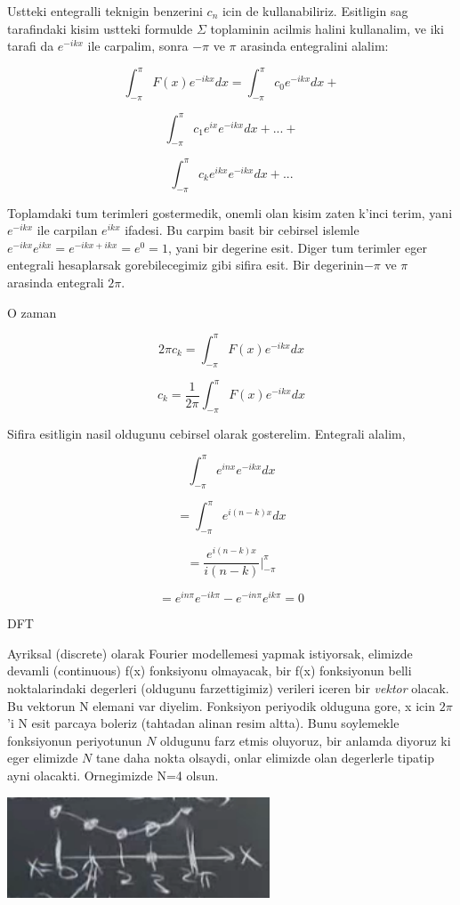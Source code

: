 \documentclass[12pt,fleqn]{article}\usepackage{../common}
\begin{document}
Ustteki entegralli teknigin benzerini $c_n$ icin de
kullanabiliriz. Esitligin sag tarafindaki kisim ustteki formulde
$\Sigma$ toplaminin acilmis halini kullanalim, ve iki tarafi da
$e^{-ikx}$ ile carpalim, sonra $-\pi$ ve $\pi$ arasinda entegralini
alalim:

$$ \int_{-\pi}^{\pi}F(x)e^{-ikx}dx = \int_{-\pi}^{\pi}c_0e^{-ikx}dx + $$

$$ \int_{-\pi}^{\pi}c_1e^{ix}e^{-ikx}dx + ... +  $$

$$ \int_{-\pi}^{\pi}c_ke^{ikx}e^{-ikx}dx + ... $$

Toplamdaki tum terimleri gostermedik, onemli olan kisim zaten k'inci terim, yani
$e^{-ikx}$ ile carpilan $e^{ikx}$ ifadesi. Bu carpim basit bir cebirsel islemle
$e^{-ikx}e^{ikx} = e^{-ikx + ikx} = e^{0} = 1$, yani bir degerine esit. Diger
tum terimler eger entegrali hesaplarsak gorebilecegimiz gibi sifira esit. Bir
degerinin$-\pi$ ve $\pi$ arasinda entegrali $2\pi$. 

O zaman

$$ 2\pi c_k = \int_{-\pi}^{\pi}F(x)e^{-ikx}dx $$

$$ c_k = \frac{1}{2\pi}\int_{-\pi}^{\pi}F(x)e^{-ikx}dx $$

Sifira esitligin nasil oldugunu cebirsel olarak gosterelim. Entegrali alalim,

$$ \int_{-\pi}^{\pi}e^{inx}e^{-ikx}dx $$

$$ = \int_{-\pi}^{\pi}e^{i(n-k)x}dx $$

$$ = \frac{e^{i(n-k)x}}{i(n-k)} \bigg|_{-\pi}^{\pi}  $$

$$ = e^{in\pi}e^{-ik\pi} - e^{-in\pi}e^{ik\pi} = 0 $$

DFT

Ayriksal (discrete) olarak Fourier modellemesi yapmak istiyorsak, elimizde
devamli (continuous) f(x) fonksiyonu olmayacak, bir f(x) fonksiyonun belli
noktalarindaki degerleri (oldugunu farzettigimiz) verileri iceren bir {\em
  vektor} olacak. Bu vektorun N elemani var diyelim. Fonksiyon periyodik
olduguna gore, x icin $2\pi$'i N esit parcaya boleriz (tahtadan alinan
resim altta). Bunu soylemekle fonksiyonun periyotunun $N$ oldugunu farz
etmis oluyoruz, bir anlamda diyoruz ki eger elimizde $N$ tane daha nokta
olsaydi, onlar elimizde olan degerlerle tipatip ayni olacakti. Ornegimizde
N=4 olsun.

\includegraphics[height=3cm]{four.png}
\end{document}
